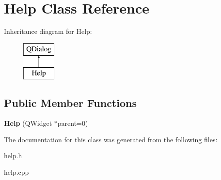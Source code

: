 \hypertarget{class_help}{\section{Help Class Reference}
\label{class_help}
}
Inheritance diagram for Help\-:\begin{figure}[H]
\begin{center}
\leavevmode
\includegraphics[height=2.000000cm]{class_help}
\end{center}
\end{figure}
\subsection*{Public Member Functions}
\begin{DoxyCompactItemize}
\item 
\hypertarget{class_help_a7359f816eb2dab34e4c7017e36c9654d}{{\bfseries Help} (Q\-Widget $\ast$parent=0)}\label{class_help_a7359f816eb2dab34e4c7017e36c9654d}

\end{DoxyCompactItemize}


The documentation for this class was generated from the following files\-:\begin{DoxyCompactItemize}
\item 
help.\-h\item 
help.\-cpp\end{DoxyCompactItemize}
